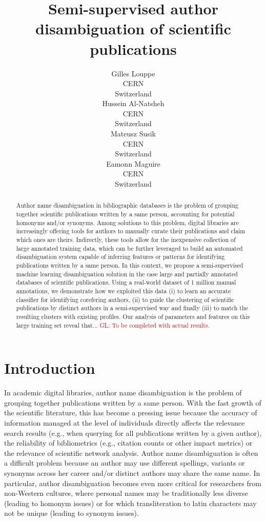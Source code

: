 \documentclass{article}
\title{Semi-supervised author disambiguation of scientific publications}
\author{Gilles Louppe\\
        CERN\\
        Switzerland\\
\And Hussein Al-Natsheh\\
        CERN\\
        Switzerland\\
\And Mateusz Susik\\
        CERN\\
        Switzerland\\
\And Eamonn Maguire\\
        CERN\\
        Switzerland}
\date{}
\newcommand{\glnote}[1]{\textcolor{red}{GL: #1}}
\begin{document}
\maketitle

\begin{abstract}

Author name disambiguation in bibliographic databases is the problem of
grouping together scientific publications written by a same person, accounting
for potential homonyms and/or synonyms. Among solutions to this problem, digital
libraries are increasingly offering tools for authors to manually curate their
publications and claim which ones are theirs. Indirectly, these tools allow for
the inexpensive collection of large annotated training data, which can be
further leveraged to build an automated disambiguation system capable of
inferring features or patterns for identifying publications written by a same
person.  In this context, we propose a semi-supervised machine learning
disambiguation solution in the case large and partially annotated databases of
scientific publications. Using a real-world dataset of 1 million manual
annotations, we demonstrate how we exploited this data (i) to learn an accurate
classifier for identifying corefering authors, (ii) to guide the clustering of
scientific publications by distinct authors in a semi-supervised way and
finally (iii) to match the resulting clusters with existing profiles.  Our
analysis of parameters and features on this large training set reveal that...
\glnote{To be completed with actual results.}

\end{abstract}



\section{Introduction}
\label{introduction}


In academic digital libraries, author name disambiguation is the problem of
grouping together publications written by a same person.  With the fast growth
of the scientific literature, this has become a pressing issue because the
accuracy of information managed at the level of individuals directly affects
the relevance search results (e.g., when querying for all publications written
by a given author), the reliability of bibliometrics (e.g., citation counts or
other impact metrics) or the relevance of scientific network analysis. Author
name disambiguation is often a difficult problem because an author may use
different spellings, variants or synonyms across her career and/or distinct
authors may share the same name. In particular, author disambiguation becomes
even more critical for researchers from non-Western cultures, where personal names
may be traditionally less diverse (leading to homonym issues) or for which
transliteration to latin characters may not be unique (leading to synonym
issues).
\end{document}
